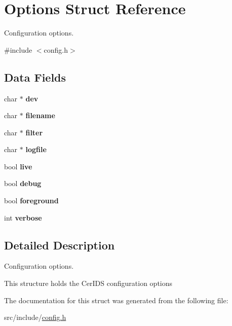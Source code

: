 \hypertarget{structOptions}{}\section{Options Struct Reference}
\label{structOptions}


Configuration options.  




{\ttfamily \#include $<$config.\+h$>$}

\subsection*{Data Fields}
\begin{DoxyCompactItemize}
\item 
\hypertarget{structOptions_a3a0af54c402856ad8f11838e7f3bb11b}{}char $\ast$ {\bfseries dev}\label{structOptions_a3a0af54c402856ad8f11838e7f3bb11b}

\item 
\hypertarget{structOptions_abec9a4fd2d6133bae143de5d15f58b8f}{}char $\ast$ {\bfseries filename}\label{structOptions_abec9a4fd2d6133bae143de5d15f58b8f}

\item 
\hypertarget{structOptions_a523541f87eb89f62fd9e5ac3ced0ff95}{}char $\ast$ {\bfseries filter}\label{structOptions_a523541f87eb89f62fd9e5ac3ced0ff95}

\item 
\hypertarget{structOptions_a6382607da3c16f25e9b19259c4c56e25}{}char $\ast$ {\bfseries logfile}\label{structOptions_a6382607da3c16f25e9b19259c4c56e25}

\item 
\hypertarget{structOptions_a8358c04f269bd9938db9cfc3b148c157}{}bool {\bfseries live}\label{structOptions_a8358c04f269bd9938db9cfc3b148c157}

\item 
\hypertarget{structOptions_a2659b52db8688c4975db64de2601a13b}{}bool {\bfseries debug}\label{structOptions_a2659b52db8688c4975db64de2601a13b}

\item 
\hypertarget{structOptions_a4ff93bf5a1ff0d3d5fd3deae5a074efa}{}bool {\bfseries foreground}\label{structOptions_a4ff93bf5a1ff0d3d5fd3deae5a074efa}

\item 
\hypertarget{structOptions_a403ce7ab580149d7e2b41a02a422f4a2}{}int {\bfseries verbose}\label{structOptions_a403ce7ab580149d7e2b41a02a422f4a2}

\end{DoxyCompactItemize}


\subsection{Detailed Description}
Configuration options. 

This structure holds the Cer\+I\+D\+S configuration options 

The documentation for this struct was generated from the following file\+:\begin{DoxyCompactItemize}
\item 
src/include/\hyperlink{config_8h}{config.\+h}\end{DoxyCompactItemize}
